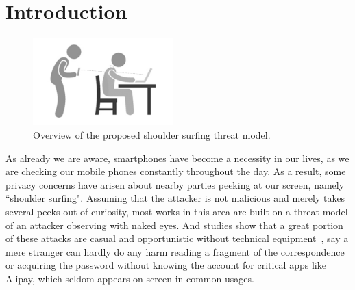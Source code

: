 \section{Introduction}
\label{sec-introduction}

\begin{figure}
	\centering
	\includegraphics[width=0.48\textwidth]{pic/intro.png}
    \caption{Overview of the proposed shoulder surfing threat model.}
	\label{fig-zeros}
\end{figure}
As already we are aware, smartphones have become a necessity in our lives, as we are checking our mobile phones constantly throughout the day. As a result, some privacy concerns have arisen about nearby parties peeking at our screen, namely ``shoulder surfing". 
Assuming that the attacker is not malicious and merely takes several peeks out of curiosity, most works in this area are built on a threat model of an attacker observing with naked eyes. And studies show that a great portion of these attacks are casual and opportunistic without technical equipment~\cite{eiband2017understanding}, say a mere stranger can hardly do any harm reading a fragment of the correspondence or acquiring the password without knowing the account for critical apps like Alipay, which seldom appears on screen in common usages. 

